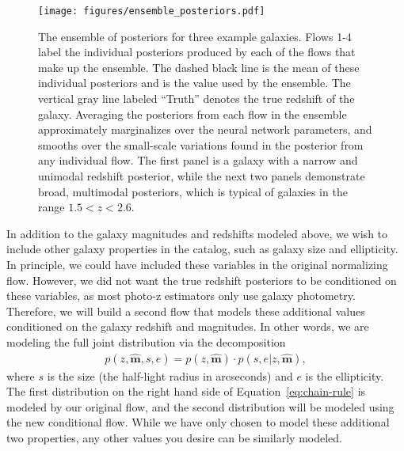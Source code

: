 \documentclass[twocolumn,twocolappendix]{aastex631}
\begin{document}
\begin{figure*}[t]
    \begin{centering}
        \texttt{[image: figures/ensemble\_posteriors.pdf]}
        \caption{
            The ensemble of posteriors for three example galaxies.
            Flows 1-4 label the individual posteriors produced by each of the flows that make up the ensemble.
            The dashed black line is the mean of these individual posteriors and is the value used by the ensemble.
            The vertical gray line labeled ``Truth'' denotes the true redshift of the galaxy.
            Averaging the posteriors from each flow in the ensemble approximately marginalizes over the neural network parameters, and smooths over the small-scale variations found in the posterior from any individual flow.
            The first panel is a galaxy with a narrow and unimodal redshift posterior, while the next two panels demonstrate broad, multimodal posteriors, which is typical of galaxies in the range $1.5 < z < 2.6$.
        }
        \label{fig:ensemble-posteriors}
    \end{centering}
\end{figure*}

In addition to the galaxy magnitudes and redshifts modeled above, we wish to include other galaxy properties in the catalog, such as galaxy size and ellipticity.
In principle, we could have included these variables in the original normalizing flow.
However, we did not want the true redshift posteriors to be conditioned on these variables, as most photo-z estimators only use galaxy photometry.
Therefore, we will build a second flow that models these additional values conditioned on the galaxy redshift and magnitudes.
In other words, we are modeling the full joint distribution via the decomposition
\begin{align}
    p(z, \mathbf{\hat{m}}, s, e) = p(z, \mathbf{\hat{m}}) \cdot p(s, e | z, \mathbf{\hat{m}}),
    \label{eq:chain-rule}
\end{align}
where $s$ is the size (the half-light radius in arcseconds) and $e$ is the ellipticity.
The first distribution on the right hand side of Equation~\ref{eq:chain-rule} is modeled by our original flow, and the second distribution will be modeled using the new conditional flow.
While we have only chosen to model these additional two properties, any other values you desire can be similarly modeled.
\end{document}
